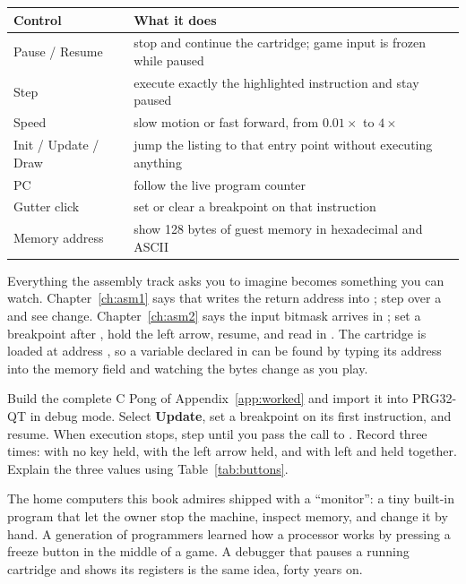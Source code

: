 \begin{center}
\begin{tabularx}{\linewidth}{@{}lX@{}}
\toprule
Control & What it does \\
\midrule
Pause / Resume & stop and continue the cartridge; game input is frozen while
  paused \\
Step & execute exactly the highlighted instruction and stay paused \\
Speed & slow motion or fast forward, from $0.01\times$ to $4\times$ \\
Init / Update / Draw & jump the listing to that entry point without executing
  anything \\
PC & follow the live program counter \\
Gutter click & set or clear a breakpoint on that instruction \\
Memory address & show 128 bytes of guest memory in hexadecimal and ASCII \\
\bottomrule
\end{tabularx}
\label{tab:qtdebug}
\end{center}

Everything the assembly track asks you to imagine becomes something you can
watch. Chapter~\ref{ch:asm1} says that  writes the return address into
; step over a  and see  change. Chapter~\ref{ch:asm2}
says the input bitmask arrives in ; set a breakpoint after
, hold the left arrow, resume, and read
 in . The cartridge is loaded at address
, so a variable declared in  can be found by typing
its address into the memory field and watching the bytes change as you play.

\begin{prgtry}
Build the complete C Pong of Appendix~\ref{app:worked} and import it into
PRG32-QT in debug mode. Select \textbf{Update}, set a breakpoint on its first
instruction, and resume. When execution stops, step until you pass the call to
. Record  three times: with no key held, with
the left arrow held, and with left and  held together. Explain the three
values using Table~\ref{tab:buttons}.
\end{prgtry}

\begin{prgaside}
The home computers this book admires shipped with a ``monitor'': a tiny built-in
program that let the owner stop the machine, inspect memory, and change it by
hand. A generation of programmers learned how a processor works by pressing a
freeze button in the middle of a game. A debugger that pauses a running
cartridge and shows its registers is the same idea, forty years on.
\end{prgaside}


